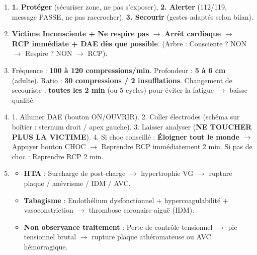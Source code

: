 \documentclass[11pt]{article}
\begin{document}
\begin{corrige}[Exercice n]
\begin{enumerate}
    \item \textbf{1. Protéger} (sécuriser zone, ne pas s'exposer), \textbf{2. Alerter} (112/119, message PASSE, ne pas raccrocher), \textbf{3. Secourir} (gestes adaptés selon bilan).
    \item \textbf{Victime Inconsciente + Ne respire pas} $\rightarrow$ \textbf{Arrêt cardiaque} $\rightarrow$ \textbf{RCP immédiate + DAE dès que possible}. (Arbre : Consciente ? NON $\rightarrow$ Respire ? NON $\rightarrow$ RCP).
    \item Fréquence : \textbf{100 à 120 compressions/min}. Profondeur : \textbf{5 à 6 cm} (adulte). Ratio : \textbf{30 compressions / 2 insufflations}. Changement de secouriste : \textbf{toutes les 2 min} (ou 5 cycles) pour éviter la fatigue $\rightarrow$ baisse qualité.
    \item 1. Allumer DAE (bouton ON/OUVRIR). 2. Coller électrodes (schéma sur boîtier : sternum droit / apex gauche). 3. Laisser analyser (\textbf{NE TOUCHER PLUS LA VICTIME}). 4. Si choc conseillé : \textbf{Éloigner tout le monde} $\rightarrow$ Appuyer bouton CHOC $\rightarrow$ Reprendre RCP immédiatement 2 min. Si pas de choc : Reprendre RCP 2 min.
    \item \begin{itemize}
        \item \textbf{HTA} : Surcharge de post-charge $\rightarrow$ hypertrophie VG $\rightarrow$ rupture plaque / anévrisme / IDM / AVC.
        \item \textbf{Tabagisme} : Endothélium dysfonctionnel + hypercoagulabilité + vasoconstriction $\rightarrow$ thrombose coronaire aiguë (IDM).
        \item \textbf{Non observance traitement} : Perte de contrôle tensionnel $\rightarrow$ pic tensionnel brutal $\rightarrow$ rupture plaque athéromateuse ou AVC hémorragique.
    \end{itemize}
\end{enumerate}
\end{corrige}
\end{document}
